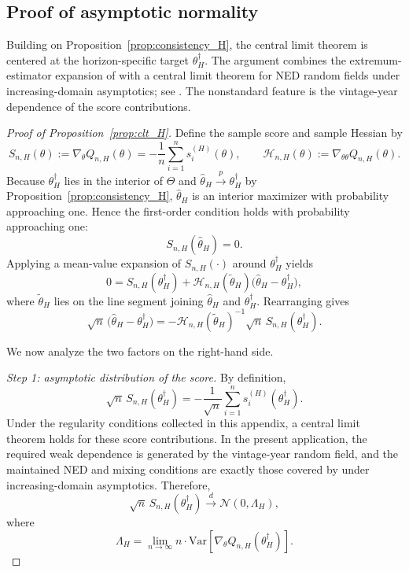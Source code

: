 \subsection{Proof of asymptotic normality}

Building on Proposition~\ref{prop:consistency_H}, the central limit theorem is centered at the horizon-specific target \(\theta_H^\dagger\). The argument combines the extremum-estimator expansion of \citet[Theorem~3.1]{NM94} with a central limit theorem for NED random fields under increasing-domain asymptotics; see \citet[Theorem~4]{JP12}. The nonstandard feature is the vintage-year dependence of the score contributions.

\begin{proof}[Proof of Proposition~\ref{prop:clt_H}]
	Define the sample score and sample Hessian by
	\[
	S_{n,H}(\theta)
	:=
	\nabla_\theta Q_{n,H}(\theta)
	=
	-
	\frac{1}{n}
	\sum_{i=1}^n s_i^{(H)}(\theta),
	\qquad
	\mathcal H_{n,H}(\theta)
	:=
	\nabla_{\theta\theta} Q_{n,H}(\theta).
	\]
	Because $\theta_H^\dagger$ lies in the interior of $\Theta$ and
	$\hat\theta_H \xrightarrow{p} \theta_H^\dagger$ by Proposition~\ref{prop:consistency_H},
	$\hat\theta_H$ is an interior maximizer with probability approaching one.
	Hence the first-order condition holds with probability approaching one:
	\[
	S_{n,H}(\hat\theta_H)=0.
	\]
	Applying a mean-value expansion of $S_{n,H}(\cdot)$ around $\theta_H^\dagger$ yields
	\[
	0
	=
	S_{n,H}(\theta_H^\dagger)
	+
	\mathcal H_{n,H}(\tilde\theta_H)
	\bigl(\hat\theta_H-\theta_H^\dagger\bigr),
	\]
	where $\tilde\theta_H$ lies on the line segment joining $\hat\theta_H$ and $\theta_H^\dagger$.
	Rearranging gives
	\begin{equation}
		\label{eq:appendix_asymptotic_linearization_H}
		\sqrt{n}\,\bigl(\hat\theta_H-\theta_H^\dagger\bigr)
		=
		-
		\mathcal H_{n,H}(\tilde\theta_H)^{-1}
		\sqrt{n}\,S_{n,H}(\theta_H^\dagger).
	\end{equation}
	
	We now analyze the two factors on the right-hand side.
	
	\emph{Step 1: asymptotic distribution of the score.}
	By definition,
	\[
	\sqrt{n}\,S_{n,H}(\theta_H^\dagger)
	=
	-
	\frac{1}{\sqrt{n}}
	\sum_{i=1}^n s_i^{(H)}(\theta_H^\dagger).
	\]
	Under the regularity conditions collected in this appendix, a central limit theorem holds for these score contributions.
	In the present application, the required weak dependence is generated by the vintage-year random field, and the maintained NED and mixing conditions are exactly those covered by \citet[Theorem~4]{JP12} under increasing-domain asymptotics.
	Therefore,
	\[
	\sqrt{n}\,S_{n,H}(\theta_H^\dagger)
	\overset{d}{\longrightarrow}
	\mathcal N(0,\Lambda_H),
	\]
	where
	\[
	\Lambda_H
	=
	\lim_{n\to\infty}
	n\cdot\mathrm{Var}\!\left[\nabla_\theta Q_{n,H}(\theta_H^\dagger)\right].
	\]
	

\end{proof}
